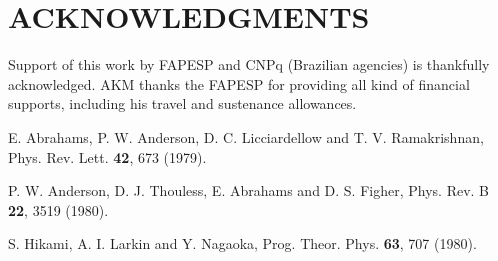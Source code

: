 \documentclass[prb,showpacs,showkeys,twocolumn]{revtex4}
\begin{document}
\section{ACKNOWLEDGMENTS}
	Support of this work by FAPESP and CNPq (Brazilian agencies) is thankfully acknowledged. AKM thanks the FAPESP for providing all kind of financial supports, including his travel and sustenance allowances.

\begin{thebibliography}{++}
	 E. Abrahams, P. W. Anderson, D. C. Licciardellow and T. V. Ramakrishnan, Phys. Rev. Lett. \textbf{42}, 673 (1979).
	
	 P. W. Anderson, D. J. Thouless, E. Abrahams and D. S. Figher, Phys. Rev. B \textbf{22}, 3519 (1980).
	
	 S. Hikami, A. I. Larkin and Y. Nagaoka, Prog. Theor. Phys. \textbf{63}, 707 (1980).	
\end{thebibliography}
\end{document}
